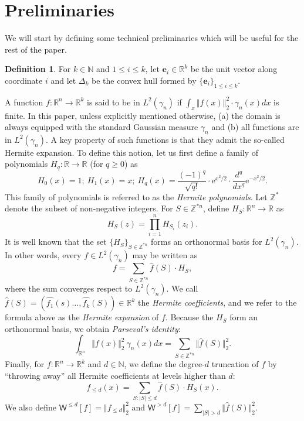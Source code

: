 \documentclass[11pt]{article}
\numberwithin{equation}{section}
\theoremstyle{definition}
\newtheorem{definition}[theorem]{Definition}
\theoremstyle{plain}
\newcommand{\R}{\mathbb R}
\newcommand{\eee}{\mathrm e}
\begin{document}
\section{Preliminaries} 
We will start by defining some technical preliminaries which will be useful for the rest of the paper. 
\begin{definition}
For $k \in \mathbb{N}$ and $1\le i \le k$, let $\mathbf{e}_i \in \R^k$ be the unit vector along coordinate $i$ and let $\Delta_k$ be the convex hull formed by $\{ \mathbf{e}_i \}_{1\le i \le k}$. 
\end{definition}
A function $f: \mathbb{R}^n \rightarrow \mathbb{R}^k$ is said to be in $L^2(\gamma_n)$ if $\int_x \Vert f(x)\Vert_2^2 \cdot \gamma_n(x) dx$ is finite.  In this paper, unless explicitly mentioned otherwise, (a) the domain is always equipped with the standard Gaussian measure $\gamma_n$ and (b) all functions are in $L^2(\gamma_n)$. 
 A key property of such functions is that they admit the so-called Hermite expansion. To define this notion, let us first define a family of polynomials $H_q: \mathbb{R} \rightarrow \mathbb{R}$ (for $q \ge 0$) as 
$$
H_0(x) = 1 ; \ H_1(x) = x ; \  H_q(x) = \frac{(-1)^q}{\sqrt{q!}}  \cdot \eee^{x^2/2}  \cdot \frac{d^q}{dx^q} \eee^{-x^2/2}. 
$$
This family of polynomials is referred to as the \emph{Hermite polynomials}. Let $\mathbb{Z}^{\ast}$ denote the subset of non-negative integers. For $S \in \mathbb{Z}^{\ast n}$, define $H_S: \mathbb{R}^n \rightarrow \mathbb{R}$ as
$$
H_S(z) = \prod_{i=1}^n H_{S_i}(z_i). 
$$
It is well known that the set $\{H_S\}_{S \in \mathbb{Z}^{\ast n}}$ forms an orthonormal basis for $L^2(\gamma_n)$. In other words, every $f \in L^2(\gamma_n)$
may be written as
$$
f = \sum_{S \in \mathbb{Z}^{\ast n}} \widehat{f}(S) \cdot H_S,
$$
where the sum converges respect to $L^2(\gamma_n)$. We call $\widehat{f}(S) = (\widehat{f_1}(s) \ldots, \widehat{f_k}(S)) \in
\mathbb{R}^k$ the \emph{Hermite coefficients}, and we refer to the formula above as the \emph{Hermite expansion} of $f$. 
Because the $H_S$ form an orthonormal basis, we obtain \emph{Parseval's identity}:
\begin{equation}\label{eq:parseval}
    \int_{\R^n} \Vert f (x) \Vert_2^2  \ \gamma_n(x) dx = \sum_{S \in \mathbb{Z}^{\ast n}} \Vert \widehat{f}(S) \Vert_2^2.
\end{equation}
Finally, for $f: \mathbb{R}^n \rightarrow \mathbb{R}^k$ and $d \in \mathbb{N}$, we define the degree-$d$ truncation of $f$ by ``throwing away''
all Hermite coefficients at levels higher than $d$:
$$
f_{\le d} (x) = \sum_{S: |S| \le d} \widehat{f}(S) \cdot H_S(x). 
$$
We also define $\mathsf{W}^{\le d} [f] = \Vert f_{\le d} \Vert_2^2$ and $\mathsf{W}^{> d} [f] = \sum_{|S|>d} \Vert \widehat{f}(S) \Vert_2^2$. 
\end{document}
